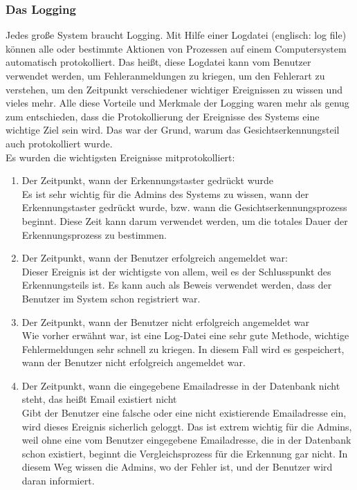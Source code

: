 \subsubsection{Das Logging}
Jedes große System braucht Logging. Mit Hilfe einer Logdatei (englisch: log file) können alle oder bestimmte Aktionen von Prozessen auf einem Computersystem automatisch protokolliert. Das heißt, diese Logdatei kann vom Benutzer verwendet werden, um Fehleranmeldungen zu kriegen, um den Fehlerart zu verstehen, um den Zeitpunkt verschiedener wichtiger Ereignissen zu wissen und vieles mehr. Alle diese Vorteile und Merkmale der Logging waren mehr als genug zum entschieden, dass die Protokollierung der Ereignisse des Systems eine wichtige Ziel sein wird. Das war der Grund, warum das Gesichtserkennungsteil auch protokolliert wurde.\\
Es wurden die wichtigsten Ereignisse mitprotokolliert:
\begin{enumerate}
	\item Der Zeitpunkt, wann der Erkennungstaster gedrückt wurde \\
	
	Es ist sehr wichtig für die Admins des Systems zu wissen, wann der Erkennungstaster gedrückt wurde, bzw. wann die Gesichtserkennungsprozess beginnt. Diese Zeit kann darum verwendet werden, um die totales Dauer der Erkennungsprozess zu bestimmen.
	
	\item Der Zeitpunkt, wann der Benutzer erfolgreich angemeldet war: \\
	
	Dieser Ereignis ist der wichtigste von allem, weil es der Schlusspunkt des Erkennungsteils ist. Es kann auch als Beweis verwendet werden, dass der Benutzer im System schon registriert war.
	
	\item Der Zeitpunkt, wann der Benutzer nicht erfolgreich angemeldet war \\
	
	Wie vorher erwähnt war, ist eine Log-Datei eine sehr gute Methode, wichtige Fehlermeldungen sehr schnell zu kriegen. In diesem Fall wird es gespeichert, wann der Benutzer nicht erfolgreich angemeldet war.
	
	\item Der Zeitpunkt, wann die eingegebene Emailadresse in der Datenbank nicht steht, das heißt Email existiert nicht \\
	
	Gibt der Benutzer eine falsche oder eine nicht existierende Emailadresse ein, wird dieses Ereignis sicherlich geloggt. Das ist extrem wichtig für die Admins, weil ohne eine vom Benutzer eingegebene Emailadresse, die in der Datenbank schon existiert, beginnt die Vergleichsprozess für die Erkennung gar nicht. In diesem Weg wissen die Admins, wo der Fehler ist, und der Benutzer wird daran informiert.
\end{enumerate}
